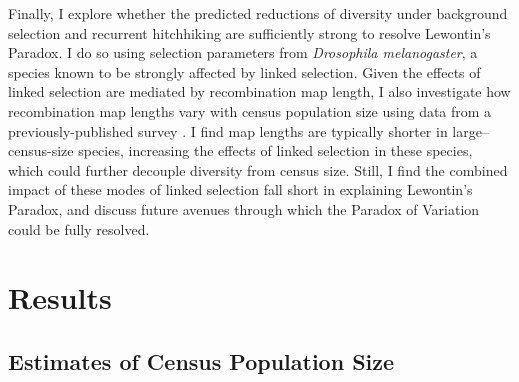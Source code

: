 \documentclass[9pt,lineno]{elife}
\begin{document}
Finally, I explore whether the predicted reductions of diversity under
background selection and recurrent hitchhiking are sufficiently strong to
resolve Lewontin's Paradox. I do so using selection parameters from
\emph{Drosophila melanogaster}, a species known to be strongly affected by
linked selection. Given the effects of linked selection are mediated by
recombination map length, I also investigate how recombination map lengths vary
with census population size using data from a previously-published survey
\citep{Stapley2017-fs}. I find map lengths are typically shorter in
large--census-size species, increasing the effects of linked selection in these
species, which could further decouple diversity from census size. Still, I find
the combined impact of these modes of linked selection fall short in explaining
Lewontin's Paradox, and discuss future avenues through which the Paradox of
Variation could be fully resolved.


\section{Results}

\subsection{Estimates of Census Population Size}
\end{document}
